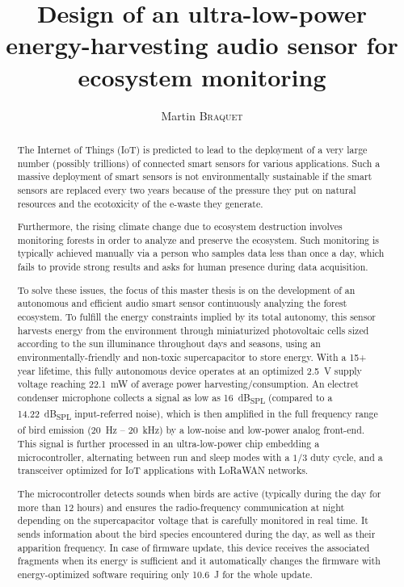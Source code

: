 \documentclass{EPL-master-thesis-covers-EN}
\title{Design of an ultra-low-power energy-harvesting audio sensor for ecosystem monitoring}
\author{Martin \textsc{Braquet}\!\nnfootnote{\url{martin.braquet@hotmail.com}}}
\begin{document}
\hypersetup{pageanchor=false}

\maketitle

\begin{abstract}

The Internet of Things (IoT) is predicted to lead to the deployment of a very large number (possibly trillions) of connected smart sensors for various applications. Such a massive deployment of smart sensors is not environmentally sustainable if the smart sensors are replaced every two years because of the pressure they put on natural resources and the ecotoxicity of the e-waste they generate.

Furthermore, the rising climate change due to ecosystem destruction involves monitoring forests in order to analyze and preserve the ecosystem. Such monitoring is typically achieved manually via a person who samples data less than once a day, which fails to provide strong results and asks for human presence during data acquisition.

To solve these issues, the focus of this master thesis is on the development of an autonomous and efficient audio smart sensor continuously analyzing the forest ecosystem. To fulfill the energy constraints implied by its total autonomy, this sensor harvests energy from the environment through miniaturized photovoltaic cells sized according to the sun illuminance throughout days and seasons, using an environmentally-friendly and non-toxic supercapacitor to store energy.
With a 15+ year lifetime, this fully autonomous device operates at an optimized \SI{2.5}{V} supply voltage reaching \SI{22.1}{mW} of average power harvesting/consumption. An electret condenser microphone collects a signal as low as \SI{16}{dB_{SPL}} (compared to a \SI{14.22}{dB_{SPL}} input-referred noise), which is then amplified in the full frequency range of bird emission (\SI{20}{Hz} -- \SI{20}{kHz}) by a low-noise and low-power analog front-end. This signal is further processed in an ultra-low-power chip embedding a microcontroller, alternating between run and sleep modes with a $1/3$ duty cycle, and a transceiver optimized for IoT applications with LoRaWAN networks. 

The microcontroller detects sounds when birds are active (typically during the day for more than 12 hours) and ensures the radio-frequency communication at night depending on the supercapacitor voltage that is carefully monitored in real time. It sends information about the bird species encountered during the day, as well as their apparition frequency. In case of firmware update, this device receives the associated fragments when its energy is sufficient and it automatically changes the firmware with energy-optimized software requiring only \SI{10.6}{J} for the whole update.


\end{abstract}
\end{document}
